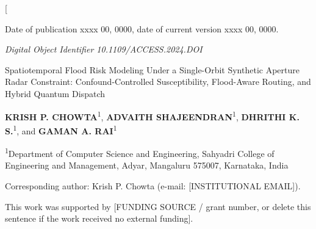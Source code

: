 \documentclass[10pt,twocolumn]{article}
\begin{document}
\thispagestyle{accessfirst}
\twocolumn[
\begin{@twocolumnfalse}
\vspace*{-2pt}

{\fontsize{7.5}{9}\selectfont
Date of publication xxxx 00, 0000, date of current version xxxx 00, 0000.\par}
{\fontsize{6}{8}\selectfont\itshape
Digital Object Identifier 10.1109/ACCESS.2024.DOI\par}

\vspace{18pt}

{\helv\fontsize{22}{25}\bfseries\color{accessblue}\raggedright
Spatiotemporal Flood Risk Modeling Under a Single-Orbit Synthetic Aperture Radar Constraint: Confound-Controlled Susceptibility, Flood-Aware Routing, and Hybrid Quantum Dispatch\par}

\vspace{12pt}

\begin{minipage}{\dimexpr\textwidth-0.958in\relax}
{\helv\fontsize{10}{12}\selectfont\raggedright
\textbf{KRISH P. CHOWTA}\textsuperscript{1},
\textbf{ADVAITH SHAJEENDRAN}\textsuperscript{1},
\textbf{DHRITHI K. S.}\textsuperscript{1},
and \textbf{GAMAN A. RAI}\textsuperscript{1}\par}

\vspace{5pt}

{\fontsize{7.5}{9}\selectfont\raggedright
\textsuperscript{1}Department of Computer Science and Engineering, Sahyadri College of Engineering and Management, Adyar, Mangaluru 575007, Karnataka, India

Corresponding author: Krish P. Chowta (e-mail: [INSTITUTIONAL EMAIL]).\par}
\end{minipage}

\vspace{10pt}

{\fontsize{7}{9}\selectfont
This work was supported by [FUNDING SOURCE / grant number, or delete this sentence if the work received no external funding].\par}

\vspace{12pt}


\end{@twocolumnfalse}
\end{document}
